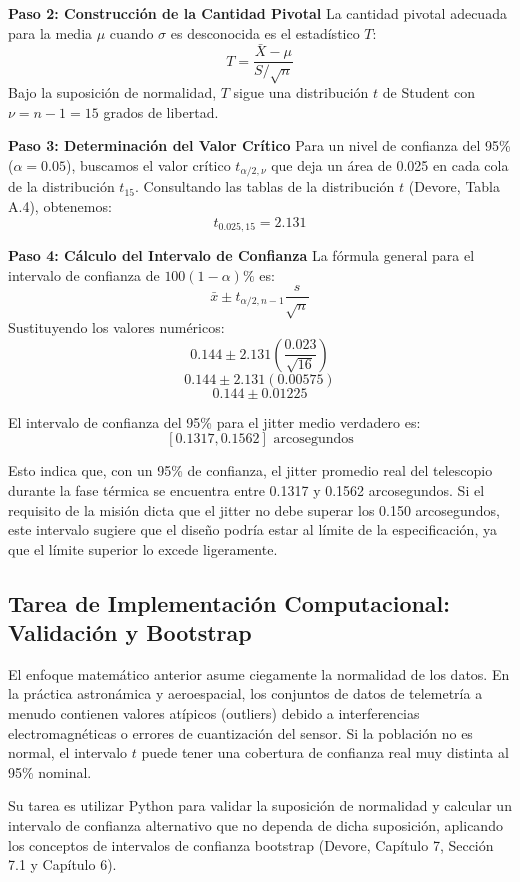 \textbf{Paso 2: Construcción de la Cantidad Pivotal}
La cantidad pivotal adecuada para la media $\mu$ cuando $\sigma$ es desconocida es el estadístico $T$:
$$ T = \frac{\bar{X} - \mu}{S / \sqrt{n}} $$
Bajo la suposición de normalidad, $T$ sigue una distribución $t$ de Student con $\nu = n - 1 = 15$ grados de libertad.

\textbf{Paso 3: Determinación del Valor Crítico}
Para un nivel de confianza del 95\% ($\alpha = 0.05$), buscamos el valor crítico $t_{\alpha/2, \nu}$ que deja un área de 0.025 en cada cola de la distribución $t_{15}$. Consultando las tablas de la distribución $t$ (Devore, Tabla A.4), obtenemos:
$$ t_{0.025, 15} = 2.131 $$

\textbf{Paso 4: Cálculo del Intervalo de Confianza}
La fórmula general para el intervalo de confianza de $100(1-\alpha)\%$ es:
$$ \bar{x} \pm t_{\alpha/2, n-1} \frac{s}{\sqrt{n}} $$
Sustituyendo los valores numéricos:
$$ 0.144 \pm 2.131 \left( \frac{0.023}{\sqrt{16}} \right) $$
$$ 0.144 \pm 2.131 \left( 0.00575 \right) $$
$$ 0.144 \pm 0.01225 $$

El intervalo de confianza del 95\% para el jitter medio verdadero es:
$$ [0.1317, 0.1562] \text{ arcosegundos} $$

Esto indica que, con un 95\% de confianza, el jitter promedio real del telescopio durante la fase térmica se encuentra entre 0.1317 y 0.1562 arcosegundos. Si el requisito de la misión dicta que el jitter no debe superar los 0.150 arcosegundos, este intervalo sugiere que el diseño podría estar al límite de la especificación, ya que el límite superior lo excede ligeramente.

\subsection*{Tarea de Implementación Computacional: Validación y Bootstrap}

El enfoque matemático anterior asume ciegamente la normalidad de los datos. En la práctica astronámica y aeroespacial, los conjuntos de datos de telemetría a menudo contienen valores atípicos (outliers) debido a interferencias electromagnéticas o errores de cuantización del sensor. Si la población no es normal, el intervalo $t$ puede tener una cobertura de confianza real muy distinta al 95\% nominal. 

Su tarea es utilizar Python para validar la suposición de normalidad y calcular un intervalo de confianza alternativo que no dependa de dicha suposición, aplicando los conceptos de intervalos de confianza bootstrap (Devore, Capítulo 7, Sección 7.1 y Capítulo 6).

